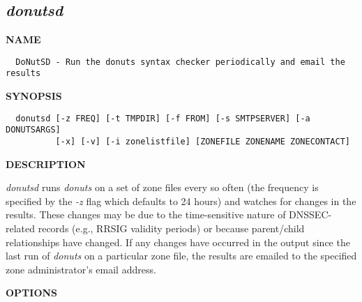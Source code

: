 \clearpage

\subsection{\it donutsd}

{\bf NAME}

\begin{verbatim}  DoNutSD - Run the donuts syntax checker periodically and email the results\end{verbatim}

{\bf SYNOPSIS}

\begin{verbatim}
  donutsd [-z FREQ] [-t TMPDIR] [-f FROM] [-s SMTPSERVER] [-a DONUTSARGS]
          [-x] [-v] [-i zonelistfile] [ZONEFILE ZONENAME ZONECONTACT]
\end{verbatim}

{\bf DESCRIPTION}

{\it donutsd} runs {\it donuts} on a set of zone files every so often (the
frequency is specified by the {\it -z} flag which defaults to 24 hours) and
watches for changes in the results.  These changes may be due to the
time-sensitive nature of DNSSEC-related records (e.g., RRSIG validity
periods) or because parent/child relationships have changed.  If any
changes have occurred in the output since the last run of {\it donuts} on a
particular zone file, the results are emailed to the specified zone
administrator's email address.

{\bf OPTIONS}

